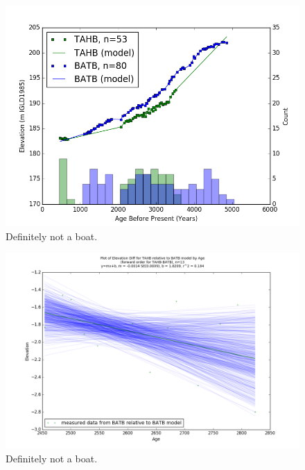 \documentclass{article}
\begin{document}
\begin{figure}[h]
	\includegraphics[width=\linewidth]{data/TAHB-BATB_DataAndModel.png}
	\caption{Definitely not a boat.}
	\label{fig:data_TAHBxBATB}
\end{figure}
\newpage

\begin{figure}[h]
	\includegraphics[width=\linewidth]{data/gias/theGIA_TAHB_relative_to_BATB.png}
	\caption{Definitely not a boat.}
	\label{fig:gias_TAHBxBATB}
\end{figure}
\newpage
\end{document}
